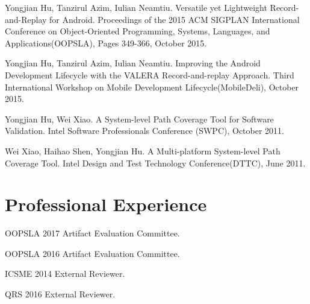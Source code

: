 \documentclass[margin,line]{res}
\begin{document}
\begin{resume}
Yongjian Hu, Tanzirul Azim, Iulian Neamtiu. Versatile yet Lightweight Record-and-Replay for Android.
Proceedings of the 2015 ACM SIGPLAN International Conference on Object-Oriented Programming, Systems, Languages, and Applications(OOPSLA),
Pages 349-366, October 2015.

Yongjian Hu, Tanzirul Azim, Iulian Neamtiu. Improving the Android Development Lifecycle with the VALERA Record-and-replay Approach.
Third International Workshop on Mobile Development Lifecycle(MobileDeli), October 2015.


Yongjian Hu, Wei Xiao. A System-level Path Coverage Tool for Software Validation.
Intel Software Professionals Conference (SWPC), October 2011.

Wei Xiao, Haihao Shen, Yongjian Hu. A Multi-platform System-level Path Coverage Tool.
Intel Design and Test Technology Conference(DTTC), June 2011.







\section{\sc Professional Experience}

OOPSLA 2017 Artifact Evaluation Committee.

\vspace*{-2.5mm}
OOPSLA 2016 Artifact Evaluation Committee.

\vspace*{-2.5mm}
ICSME 2014 External Reviewer.

\vspace*{-2.5mm}
QRS 2016 External Reviewer.

\vspace*{1.5cm}


\end{resume}
\end{document}
